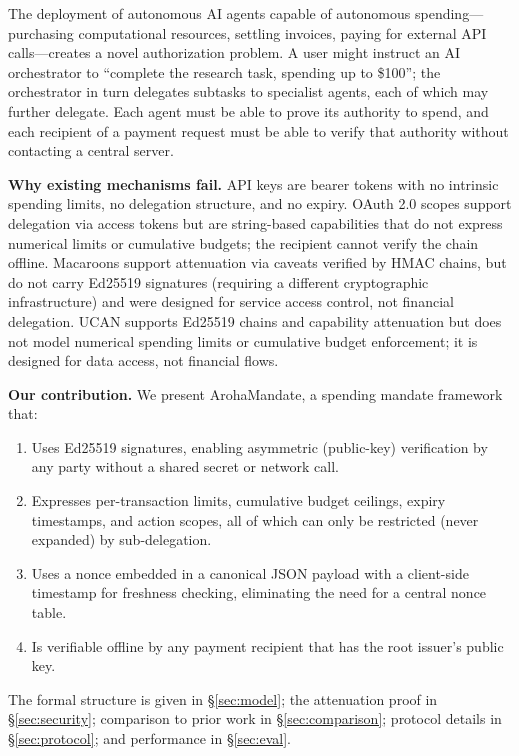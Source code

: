 \documentclass[conference]{IEEEtran}
\begin{document}
The deployment of autonomous AI agents capable of autonomous
spending—purchasing computational resources, settling invoices,
paying for external API calls—creates a novel authorization
problem.  A user might instruct an AI orchestrator to
``complete the research task, spending up to \$100'';
the orchestrator in turn delegates subtasks to specialist
agents, each of which may further delegate.  Each agent must
be able to prove its authority to spend, and each recipient
of a payment request must be able to verify that authority
without contacting a central server.

\textbf{Why existing mechanisms fail.}
API keys are bearer tokens with no intrinsic spending limits,
no delegation structure, and no expiry.  OAuth 2.0 scopes
\cite{rfc6749} support delegation via access tokens but are
string-based capabilities that do not express numerical
limits or cumulative budgets; the recipient cannot verify
the chain offline.  Macaroons \cite{birgisson2014macaroons}
support attenuation via caveats verified by HMAC chains, but
do not carry Ed25519 signatures (requiring a different
cryptographic infrastructure) and were designed for service
access control, not financial delegation.  UCAN
\cite{fission2022ucan} supports Ed25519 chains and
capability attenuation but does not model numerical spending
limits or cumulative budget enforcement; it is designed for
data access, not financial flows.

\textbf{Our contribution.}
We present ArohaMandate, a spending mandate framework that:
\begin{enumerate}
  \item Uses Ed25519 signatures, enabling asymmetric
    (public-key) verification by any party without a shared
    secret or network call.
  \item Expresses per-transaction limits, cumulative budget
    ceilings, expiry timestamps, and action scopes, all of
    which can only be restricted (never expanded) by
    sub-delegation.
  \item Uses a nonce embedded in a canonical JSON payload
    with a client-side timestamp for freshness checking,
    eliminating the need for a central nonce table.
  \item Is verifiable offline by any payment recipient that
    has the root issuer's public key.
\end{enumerate}

The formal structure is given in \S\ref{sec:model}; the
attenuation proof in \S\ref{sec:security}; comparison to
prior work in \S\ref{sec:comparison}; protocol details in
\S\ref{sec:protocol}; and performance in \S\ref{sec:eval}.
\end{document}
